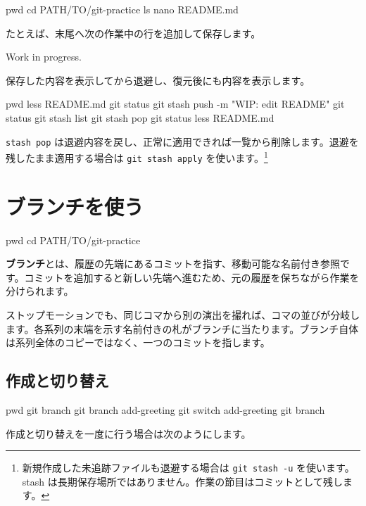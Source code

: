 \documentclass[a4paper,11pt]{jlreq}
\newcommand{\cmd}[1]{\texttt{#1}}
\newcommand{\term}[1]{\textbf{#1}}
\begin{document}
\begin{codeblock}
pwd
cd PATH/TO/git-practice
ls
nano README.md
\end{codeblock}

たとえば、末尾へ次の作業中の行を追加して保存します。

\begin{codeblock}
Work in progress.
\end{codeblock}

保存した内容を表示してから退避し、復元後にも内容を表示します。

\begin{codeblock}
pwd
less README.md
git status
git stash push -m "WIP: edit README"
git status
git stash list
git stash pop
git status
less README.md
\end{codeblock}

\cmd{stash pop} は退避内容を戻し、正常に適用できれば一覧から削除します。退避を残したまま適用する場合は \cmd{git stash apply} を使います。\footnote{新規作成した未追跡ファイルも退避する場合は \cmd{git stash -u} を使います。stash は長期保存場所ではありません。作業の節目はコミットとして残します。}

\section{ブランチを使う}

\begin{codeblock}
pwd
cd PATH/TO/git-practice
\end{codeblock}

\term{ブランチ}とは、履歴の先端にあるコミットを指す、移動可能な名前付き参照です。コミットを追加すると新しい先端へ進むため、元の履歴を保ちながら作業を分けられます。

ストップモーションでも、同じコマから別の演出を撮れば、コマの並びが分岐します。各系列の末端を示す名前付きの札がブランチに当たります。ブランチ自体は系列全体のコピーではなく、一つのコミットを指します。

\subsection{作成と切り替え}

\begin{codeblock}
pwd
git branch
git branch add-greeting
git switch add-greeting
git branch
\end{codeblock}

作成と切り替えを一度に行う場合は次のようにします。
\end{document}

